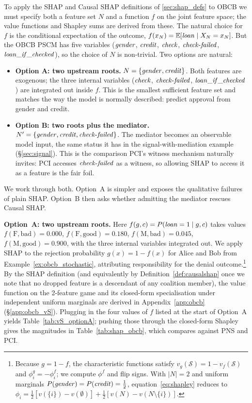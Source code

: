 To apply the SHAP and Causal SHAP definitions of \cref{sec:shap_defs}
to OBCB we must specify both a feature set $N$ and a function $f$ on the joint
feature space; the value functions and Shapley sums are derived from these.
The natural choice for $f$ is the conditional expectation of the outcome,
$f(x_N)=\mathbb{E}[\varname{loan}\mid X_N=x_N]$. But the OBCB PSCM has five
variables ($\varname{gender}$, $\varname{credit}$, $\varname{check}$,
$\varname{check\text{-}failed}$, $\varname{loan\_if\_checked}$), so the
choice of $N$ is non-trivial. Two options are natural:
\begin{itemize}
\item \textbf{Option A: two upstream roots.}
$N=\{\varname{gender},\varname{credit}\}$. Both features are exogenous; the
three internal variables ($\varname{check}$, $\varname{check\text{-}failed}$,
$\varname{loan\_if\_checked}$) are integrated out inside $f$. This is the
smallest sufficient feature set and matches the way the model is normally
described: predict approval from gender and credit.
\item \textbf{Option B: two roots plus the mediator.}
$N'=\{\varname{gender},\varname{credit},\varname{check\text{-}failed}\}$.
The mediator becomes an observable model input, the same status it has in the
signal-with-mediation example (\S\ref{sec:signal}). This is the comparison
PCI's witness mechanism naturally invites: PCI accesses
$\varname{check\text{-}failed}$ as a witness, so allowing SHAP to access it as
a feature is the fair foil.
\end{itemize}
We work through both. Option~A is simpler and exposes the qualitative failures
of plain SHAP. Option~B then asks whether admitting the mediator rescues Causal
SHAP.

\medskip\noindent\textbf{Option~A: two upstream roots.}
Here $f(g,c)=P(\varname{loan}=1\mid g,c)$ takes values
$f(\text{F},\text{bad})=0.000$, $f(\text{F},\text{good})=0.180$,
$f(\text{M},\text{bad})=0.045$, $f(\text{M},\text{good})=0.900$, with the three
internal variables integrated out. We apply SHAP to the rejection probability
$g(x)=1-f(x)$ for Alice and Bob from Example~\ref{ex:obcb_stochastic},
attributing responsibility for the denial outcome.\footnote{Because $g=1-f$,
the characteristic functions satisfy $v_g(\mathcal{S})=1-v_f(\mathcal{S})$ and
$\phi^g_i=-\phi^f_i$; we compute $\phi^f$ and flip signs. With $|N|=2$ and
uniform marginals $P(\varname{gender})=P(\varname{credit})=\tfrac{1}{2}$,
equation~\eqref{eq:shapley} reduces to
$\phi_i = \tfrac{1}{2}[v(\{i\})-v(\emptyset)] + \tfrac{1}{2}[v(N)-v(N\!\setminus\!\{i\})]$.}
By the SHAP definition (and equivalently by Definition~\ref{def:causalshap}
once we note that no dropped feature is a descendant of any coalition member),
the value function on the 2-feature game and its closed-form specialisation
under independent uniform marginals are derived in
Appendix~\ref{app:obcb} (\S\ref{app:obcb_vS}). Plugging in the four values of
$f$ listed at the start of Option~A yields Table~\ref{tab:vS_optionA}; pushing
those through the closed-form Shapley gives the magnitudes in
Table~\ref{tab:shap_obcb}, which compares against PNS and PCI.

